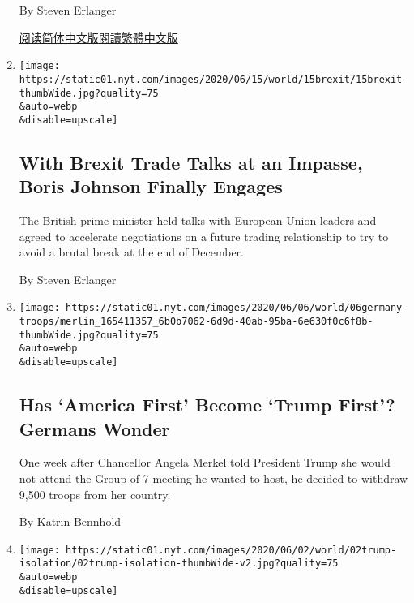 \begin{enumerate}
  By Steven Erlanger

  \href{https://cn.nytimes.com/world/20200623/china-eu-trade-talks/}{阅读简体中文版}\href{https://cn.nytimes.com/world/20200623/china-eu-trade-talks/zh-hant/}{閱讀繁體中文版}
\item
  \href{/2020/06/15/world/europe/uk-brexit-boris-johnson.html}{}

  \texttt{[image: https://static01.nyt.com/images/2020/06/15/world/15brexit/15brexit-thumbWide.jpg?quality=75\\\&auto=webp\\\&disable=upscale]}

  \hypertarget{with-brexit-trade-talks-at-an-impasse-boris-johnson-finally-engages}{%
  \subsection{With Brexit Trade Talks at an Impasse, Boris Johnson
  Finally
  Engages}\label{with-brexit-trade-talks-at-an-impasse-boris-johnson-finally-engages}}

  The British prime minister held talks with European Union leaders and
  agreed to accelerate negotiations on a future trading relationship to
  try to avoid a brutal break at the end of December.

  By Steven Erlanger
\item
  \href{/2020/06/06/world/europe/germany-troop-withdrawal-america.html}{}

  \texttt{[image: https://static01.nyt.com/images/2020/06/06/world/06germany-troops/merlin\_165411357\_6b0b7062-6d9d-40ab-95ba-6e630f0c6f8b-thumbWide.jpg?quality=75\\\&auto=webp\\\&disable=upscale]}

  \hypertarget{has-america-first-become-trump-first-germans-wonder}{%
  \subsection{Has `America First' Become `Trump First'? Germans
  Wonder}\label{has-america-first-become-trump-first-germans-wonder}}

  One week after Chancellor Angela Merkel told President Trump she would
  not attend the Group of 7 meeting he wanted to host, he decided to
  withdraw 9,500 troops from her country.

  By Katrin Bennhold
\item
  \href{/2020/06/02/world/europe/trump-merkel-allies.html}{}

  \texttt{[image: https://static01.nyt.com/images/2020/06/02/world/02trump-isolation/02trump-isolation-thumbWide-v2.jpg?quality=75\\\&auto=webp\\\&disable=upscale]}


\end{enumerate}
